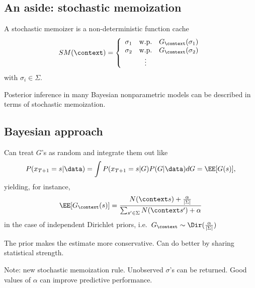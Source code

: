 \documentclass[16pt]{beamer}
\begin{document}
\subsection{An aside: stochastic memoization}
\begin{frame}[t]{}
A stochastic memoizer \cite{Goodman2008} is a non-deterministic function cache 
\begin{align*}
SM(\context) = \left\{\begin{array}{ccc}
\sigma_1  & \mbox{w.p.}  &  G_\context(\sigma_1) \\
\sigma_2  & \mbox{w.p.}  &  G_\context(\sigma_2)  \\
  &  \vdots &   
\end{array}\right.
\end{align*}
with $\sigma_i \in \Sigma$.
\vspace{.5cm}

Posterior inference in many Bayesian nonparametric models can be described in terms of stochastic memoization. 
\end{frame}

\subsection{Bayesian approach}
\begin{frame}[t]{}
Can treat $G$'s as random and integrate them out like
\begin{align*}
P(x_{T+1}=s|\data) = \int P(x_{T+1}=s|G)P(G|\data)dG = {\EE[G(s)] } ,
\end{align*}
yielding, for instance,
\begin{align*}
\EE[G_\context(s)]=\frac{N(\context s) + \frac{\alpha}{|\Sigma|}}{\sum_{s'\in\Sigma}N(\context s') + \alpha}
\end{align*}
in the case of independent Dirichlet priors, i.e.~$G_\context \sim \Dir(\frac{\alpha}{|\Sigma|})$

\vspace{.5cm}
The prior makes the estimate more conservative.  Can do better by sharing statistical strength.

\vspace{.5cm}
Note: new stochastic memoization rule.  Unobserved $\sigma$'s can be returned.  Good values of $\alpha$ can improve predictive performance.

\end{frame}
\end{document}
